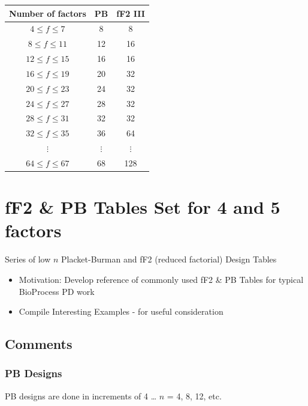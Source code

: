 \documentclass[
  12pt,
  a4paper,
]{article}
\providecommand{\tightlist}{%
  \setlength{\itemsep}{0pt}\setlength{\parskip}{0pt}}
\numberwithin{equation}{section}
\theoremstyle{plain}
\theoremstyle{definition}
\theoremstyle{remark}
\theoremstyle{note}
\begin{document}
\begin{center}
\begin{tabular}{|c|c|c|}
\hline Number of factors & PB & fF2 III \\
\hline $4 \leq f \leq 7$ & 8 & 8 \\
\hline $8 \leq f \leq 11$ & 12 & 16 \\
\hline $12 \leq f \leq 15$ & 16 & 16 \\
\hline $16 \leq f \leq 19$ & 20 & 32 \\
\hline $20 \leq f \leq 23$ & 24 & 32 \\
\hline $24 \leq f \leq 27$ & 28 & 32 \\
\hline $28 \leq f \leq 31$ & 32 & 32 \\
\hline $32 \leq f \leq 35$ & 36 & 64 \\
\hline$\vdots$ & $\vdots$ & $\vdots$ \\
\hline $64 \leq f \leq 67$ & 68 & 128 \\
\hline
\end{tabular}
\end{center}

\hypertarget{ff2-pb-tables-set-for-4-and-5-factors}{%
\section{fF2 \& PB Tables Set for 4 and 5
factors}\label{ff2-pb-tables-set-for-4-and-5-factors}}

Series of low \(n\) Placket-Burman and fF2 (reduced factorial) Design
Tables

\begin{itemize}
\tightlist
\item
  Motivation: Develop reference of commonly used fF2 \& PB Tables for
  typical BioProcess PD work
\item
  Compile Interesting Examples - for useful consideration
\end{itemize}

\hypertarget{comments}{%
\subsection{Comments}\label{comments}}

\hypertarget{pb-designs}{%
\subsubsection{PB Designs}\label{pb-designs}}

PB designs are done in increments of 4 \ldots{} \(n\) = 4, 8, 12, etc.
\end{document}
